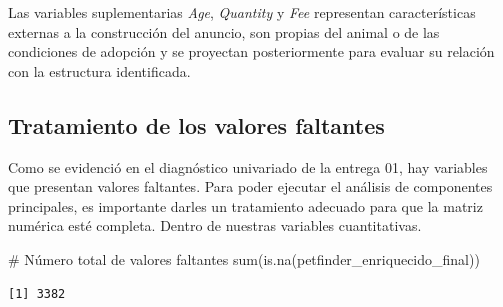 \documentclass[
  spanish,
  letterpaper,
  DIV=11,
  numbers=noendperiod]{scrartcl}
\newenvironment{Shaded}{\begin{snugshade}}{\end{snugshade}}
\newcommand{\CommentTok}[1]{\textcolor[rgb]{0.37,0.37,0.37}{#1}}
\newcommand{\FunctionTok}[1]{\textcolor[rgb]{0.28,0.35,0.67}{#1}}
\newcommand{\NormalTok}[1]{\textcolor[rgb]{0.00,0.23,0.31}{#1}}
\newcommand{\OtherTok}[1]{\textcolor[rgb]{0.00,0.23,0.31}{#1}}
\newcommand{\SpecialCharTok}[1]{\textcolor[rgb]{0.37,0.37,0.37}{#1}}
\newcommand{\StringTok}[1]{\textcolor[rgb]{0.13,0.47,0.30}{#1}}
\begin{document}
\begin{Shaded}
\end{Shaded}

Las variables suplementarias \emph{Age}, \emph{Quantity} y \emph{Fee}
representan características externas a la construcción del anuncio, son
propias del animal o de las condiciones de adopción y se proyectan
posteriormente para evaluar su relación con la estructura identificada.

\subsection{Tratamiento de los valores
faltantes}\label{tratamiento-de-los-valores-faltantes}

Como se evidenció en el diagnóstico univariado de la entrega 01, hay
variables que presentan valores faltantes. Para poder ejecutar el
análisis de componentes principales, es importante darles un tratamiento
adecuado para que la matriz numérica esté completa. Dentro de nuestras
variables cuantitativas.

\begin{Shaded}
\begin{Highlighting}[]
\CommentTok{\# Número total de valores faltantes}
\FunctionTok{sum}\NormalTok{(}\FunctionTok{is.na}\NormalTok{(petfinder\_enriquecido\_final))}
\end{Highlighting}
\end{Shaded}

\begin{verbatim}
[1] 3382
\end{verbatim}
\end{document}
